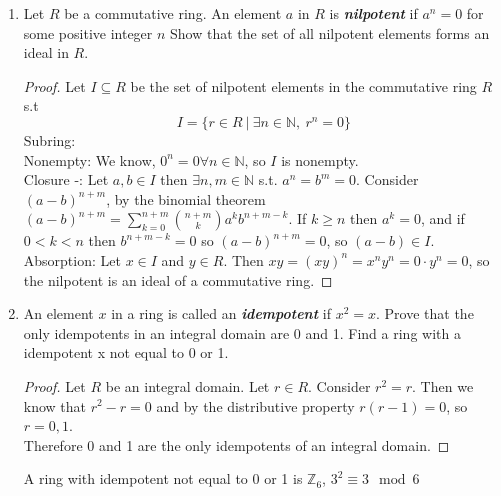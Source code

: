 \documentclass[12pt]{article}
\newcommand\setitemnumber[1]{\setcounter{enumi}{\numexpr#1--1\relax}}
\begin{document}
\begin{enumerate}[label=\textbf{\arabic*}.]
    \setitemnumber{25}
    \item Let $R$ be a commutative ring. An element $a$ in $R$ is \textbf{\textit{nilpotent}} if $a^n = 0$ for some 
    positive integer $n$ Show that the set of all nilpotent elements forms an ideal in $R$.
    \begin{proof}
        Let $I \subseteq R$ be the set of nilpotent elements in the commutative ring $R$ s.t
        \[I = \{r \in R \ | \ \exists n \in \mathbb{N}, \ r^n = 0\}\]
        Subring: \\
        Nonempty: We know, $0^n = 0 \forall n \in \mathbb{N}$, so $I$ is nonempty. \\
        Closure -: Let $a,b \in I$ then $\exists n,m \in \mathbb{N}$ s.t. $a^n = b^m = 0$. Consider ${(a-b)}^{n+m}$, 
        by the binomial theorem ${(a-b)}^{n+m} = \sum\limits_{k=0}^{n+m} \binom{n+m}{k} a^{k}b^{n+m-k}$. If $k \geq n$ 
        then $a^k = 0$, and if $0 < k < n$ then $b^{n+m-k} = 0$ so ${(a-b)}^{n+m} = 0$, so $(a-b) \in I$. \\
        Absorption: Let $x \in I$ and $y \in R$. Then $xy = {(xy)}^{n} = x^{n}y^{n} = 0 \cdot y^n = 0$, so the 
        nilpotent is an ideal of a commutative ring.
    \end{proof}

    \setitemnumber{35}
    \item An element $x$ in a ring is called an \textbf{\textit{idempotent}} if $x^2=x$. Prove that the only 
    idempotents in an integral domain are 0 and 1. Find a ring with a idempotent x not 
    equal to 0 or 1.
    \begin{proof}
        Let $R$ be an integral domain. Let $r \in R$. Consider $r^2=r$. Then we know that 
        $r^{2}-r = 0$ and by the distributive property $r(r-1) = 0$, so $r = 0,1$. \\
        Therefore 0 and 1 are the only idempotents of an integral domain.
    \end{proof}
    A ring with idempotent not equal to 0 or 1 is $\mathbb{Z}_6$, $3^2 \equiv 3 \mod{6}$
\end{enumerate}
\end{document}

